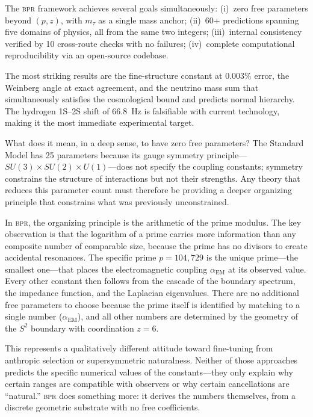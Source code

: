 \documentclass[aps,prd,twocolumn,superscriptaddress,longbibliography,nofootinbib]{revtex4-2}
\newcommand{\Stwo}{S^2}
\newcommand{\alphaEM}{\alpha_{\mathrm{EM}}}
\newcommand{\bpr}{\textsc{bpr}}
\begin{document}
The \bpr{} framework achieves several goals simultaneously:
(i)~zero free parameters beyond $(p, z)$, with $m_\tau$ as a single
mass anchor; (ii)~60+ predictions spanning five domains of physics,
all from the same two integers; (iii)~internal consistency verified
by 10 cross-route checks with no failures; (iv)~complete
computational reproducibility via an open-source codebase.

The most striking results are the fine-structure constant at
$0.003\%$ error, the Weinberg angle at exact agreement, and the
neutrino mass sum that simultaneously satisfies the cosmological
bound and predicts normal hierarchy.  The hydrogen 1S--2S shift of
66.8~Hz is falsifiable with current technology, making it the most
immediate experimental target.

What does it mean, in a deep sense, to have zero free parameters?
The Standard Model has 25 parameters because its gauge symmetry
principle---$SU(3) \times SU(2) \times U(1)$---does not specify the
coupling constants; symmetry constrains the structure of interactions
but not their strengths.  Any theory that reduces this parameter
count must therefore be providing a deeper organizing principle that
constrains what was previously unconstrained.

In \bpr, the organizing principle is the arithmetic of the prime
modulus.  The key observation is that the logarithm of a prime
carries more information than any composite number of comparable
size, because the prime has no divisors to create accidental
resonances.  The specific prime $p = 104{,}729$ is the unique
prime---the smallest one---that places the electromagnetic coupling
$\alphaEM$ at its observed value.  Every other constant then follows
from the cascade of the boundary spectrum, the impedance function,
and the Laplacian eigenvalues.  There are no additional free
parameters to choose because the prime itself is identified by
matching to a single number ($\alphaEM$), and all other numbers are
determined by the geometry of the $\Stwo$ boundary with coordination
$z = 6$.

This represents a qualitatively different attitude toward
fine-tuning from anthropic selection or supersymmetric naturalness.
Neither of those approaches predicts the specific numerical values
of the constants---they only explain why certain ranges are
compatible with observers or why certain cancellations are
``natural.''  \bpr{} does something more: it derives the numbers
themselves, from a discrete geometric substrate with no free
coefficients.
\end{document}
